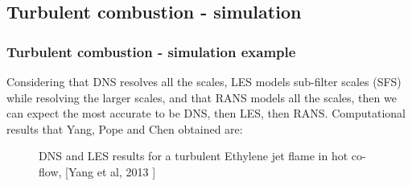 \documentclass{beamer}
\begin{document}
\subsection[simulation]{Turbulent combustion - simulation}
\begin{frame}%
\frametitle{Turbulent combustion - simulation example}
\scriptsize
{Considering that DNS resolves all the scales, LES models sub-filter scales (SFS) while resolving the larger scales, and that RANS models all the scales, then we can expect the most accurate to be DNS, then LES, then RANS. Computational results that Yang, Pope and Chen  obtained are:}
\vspace{-25pt}
\begin{figure}
\label{fig:DNSLES}
\centering
{}
\tiny{\caption{\tiny{DNS and LES results for a turbulent Ethylene jet flame in hot co-flow, [Yang et al, 2013 \cite{Pope}]}}}
\end{figure}
\end{frame}
\end{document}
